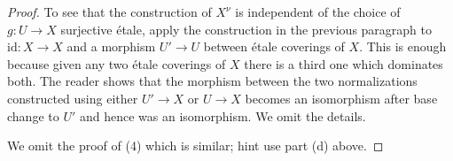 \begin{proof}
\medskip\noindent
To see that the construction of $X^\nu$ is independent of the choice
of $g : U \to X$ surjective \'etale, apply the construction in the
previous paragraph to $\text{id} : X \to X$ and a morphism
$U' \to U$ between \'etale coverings of $X$. This is enough because
given any two \'etale coverings of $X$ there is a third one which
dominates both. The reader shows that the morphism between the two
normalizations constructed using either $U' \to X$ or $U \to X$
becomes an isomorphism after base change to $U'$ and hence was
an isomorphism. We omit the details.

\medskip\noindent
We omit the proof of (4) which is similar; hint use part (d) above.
\end{proof}
